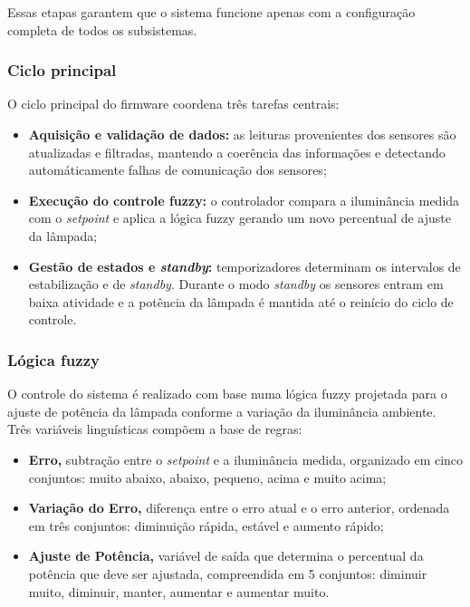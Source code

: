 Essas etapas garantem que o sistema funcione apenas com a configuração completa de todos os subsistemas.

\subsubsection{Ciclo principal}

O ciclo principal do firmware coordena três tarefas centrais:
\begin{itemize}
    \item \textbf{Aquisição e validação de dados:} as leituras provenientes dos sensores são atualizadas e filtradas, mantendo a coerência das informações e detectando automáticamente falhas de  comunicação dos sensores;
    \item \textbf{Execução do controle fuzzy:} o controlador compara a iluminância medida com o \textit{setpoint} e aplica a lógica fuzzy gerando um novo percentual de ajuste da lâmpada;
    \item \textbf{Gestão de estados e \textit{standby}:} temporizadores determinam os intervalos de estabilização e de \textit{standby}. Durante o modo \textit{standby} os sensores entram em baixa atividade e a potência da lâmpada é mantida até o reinício do ciclo de controle.
\end{itemize}

\subsubsection{Lógica fuzzy}

O controle do sistema é realizado com base numa lógica fuzzy projetada para o ajuste de potência da lâmpada conforme a variação da iluminância ambiente. Três variáveis linguísticas compõem a base de regras:
\begin{itemize}
    \item \textbf{Erro,} subtração entre o \textit{setpoint} e a iluminância medida, organizado em cinco conjuntos: muito abaixo, abaixo, pequeno, acima e muito acima;
    \item \textbf{Variação do Erro,} diferença entre o erro atual e o erro anterior, ordenada em três conjuntos: diminuição rápida, estável e aumento rápido;
    \item \textbf{Ajuste de Potência,} variável de saída que determina o percentual da potência que deve ser ajustada, compreendida em 5 conjuntos: diminuir muito, diminuir, manter, aumentar e aumentar muito.
\end{itemize}

